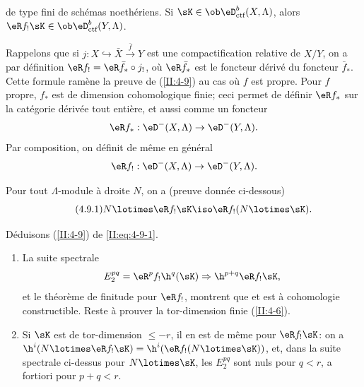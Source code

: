 \begin{theorem_}\label{II:4-9}
 de type fini de schémas noethériens. 
Si $\sK\in\ob\eD_\textnormal{ctf}^b(X,\Lambda)$, alors 
$\eR f_!\sK\in \ob\eD_\textnormal{ctf}^b(Y,\Lambda)$. 
\end{theorem_}

Rappelons que si $j:X\hookrightarrow \bar X \xrightarrow{\bar f} Y$ est une 
compactification relative de $X/Y$, on a par définition 
$\eR f_! = \eR \bar f_* \circ j_!$, où $\eR \bar f_*$ est le foncteur dérivé 
du foncteur $\bar f_*$. Cette formule ramène la preuve de (\ref{II:4-9}) 
au cas où $f$ est propre. Pour $f$ propre, $f_*$ est de dimension 
cohomologique finie; ceci permet de définir $\eR f_*$ sur la catégorie 
dérivée tout entière, et aussi comme un foncteur 
\[
  \eR f_* : \eD^-(X,\Lambda) \to \eD^-(Y,\Lambda) \text{.}
\]
Par composition, on définit de même en général 
\[
  \eR f_! : \eD^-(X,\Lambda) \to \eD^-(Y,\Lambda) \text{.}
\]

Pour tout $\Lambda$-module à droite $N$, on a (preuve donnée ci-dessous) 
\begin{equation*}\tag{4.9.1}\label{II:eq:4-9-1}
  N\lotimes \eR f_! \sK \iso \eR f_! (N\lotimes \sK) \text{.}
\end{equation*}

Déduisons (\ref{II:4-9}) de \eqref{II:eq:4-9-1}. 
\begin{enumerate}[\indent a)]
  \item La suite spectrale 
    \[
      E_2^{p q} = \eR^p f_! \h^q(\sK) \Rightarrow \h^{p+q} \eR f_! \sK \text{,}
    \]
    et le théorème de finitude pour $\eR f_!$, montrent que 
     et est à cohomologie constructible. 
    Reste à prouver la tor-dimension finie (\ref{II:4-6}). 
  \item Si $\sK$ est de tor-dimension $\leqslant -r$, il en est de même pour 
    $\eR f_! \sK$: on a $\h^i(N\lotimes \eR f_! \sK) = \h^i(\eR f_!(N\lotimes \sK))$, 
    et, dans la suite spectrale ci-dessus pour $N\lotimes \sK$, les 
    $E_2^{p q}$ sont nuls pour $q<r$, a fortiori pour $p+q<r$. 
\end{enumerate}

